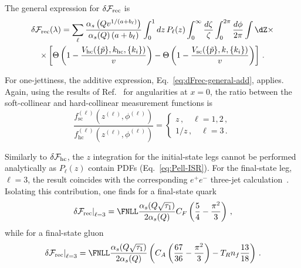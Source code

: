 The general expression for $\delta\mathcal{F}_{\rm rec}$ is
 \begin{multline}
 \label{eq:dFrec-general}
   \delta\mathcal{F}_{\rm rec}(\lambda)=\sum_\ell \frac{\alpha_s\left(Qv^{1/(a+b_\ell)}\right)}{\alpha_s(Q)\left(a+b_\ell\right)}\int_0^1 dz\,P_\ell(z) \int_0^{\infty}\frac{d\zeta}{\zeta}\int_0^{2\pi}\frac{d\phi}{2\pi}
 \int \dZ  \times\\ \times  \left[\Theta\left(1-\frac{V_{\mathrm{hc}}(\{\tilde{p}\},k_{\mathrm{hc}},\{k_i\})}{v}\right) -\Theta\left(1-\frac{V_{\mathrm{sc}}(\{\tilde{p}\},k,\{k_i\})}{v}\right)\right]\,.
\end{multline}

For one-jettiness, the additive expression,
Eq.~\eqref{eq:dFrec-general-add}, applies. Again, using the results of
Ref.~\cite{Banfi:2018mcq} for angularities at $x=0$, the ratio between the
soft-collinear and hard-collinear measurement functions is
\begin{equation}
\label{eq:tau_1-fhc}
\frac{f_{\mathrm{sc}}^{(\ell)}(z^{(\ell)},\phi^{(\ell)})}{f_{\mathrm{hc}}^{(\ell)}(z^{(\ell)},\phi^{(\ell)})}=
\begin{cases}
z\,, \quad \ell=1,2\,, \\
1/z\,, \quad \ell=3\,.
\end{cases}
\end{equation}

Similarly to $\delta\mathcal{F}_{\rm hc}$, the $z$ integration for the
initial-state legs cannot be performed analytically as $P_\ell(z)$ contain PDFs
(Eq.~\eqref{eq:Pell-ISR}). For the final-state leg,
$\ell=3$, the result coincides with the corresponding
$e^+e^-$ three-jet calculation~\cite{Arpino:2019ozn}. Isolating this
contribution, one finds for a final-state quark
\begin{equation}
  \label{eq:dFrec-tau_1q}
  \left.\delta\mathcal{F}_{\rm rec}\right|_{\ell=3}
  =\FNLL\frac{\alpha_s(Q\sqrt{\tau_1})}{2\alpha_s(Q)} C_F\left(\frac{5}{4}-\frac{\pi^2}{3}\right)\,,
\end{equation}
while for a final-state gluon
\begin{equation}
  \label{eq:dFrec-tau_1g}
  \left.\delta\mathcal{F}_{\rm rec}\right|_{\ell=3}
  =\FNLL\frac{\alpha_s(Q\sqrt{\tau_1})}{2\alpha_s(Q)} \left(
 C_A\left(\frac{67}{36}-\frac{\pi^2}{3}\right)
 -T_Rn_f\frac{13}{18} \right)\,.
 \end{equation}
 
